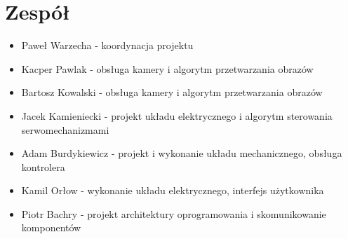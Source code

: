 \documentclass[a4paper, 11pt]{article}
\begin{document}
\newpage
\section{Zespół}
\begin{itemize}
\item Paweł Warzecha - koordynacja projektu 
\item Kacper Pawlak - obsługa kamery i algorytm przetwarzania obrazów 
\item Bartosz Kowalski - obsługa kamery i algorytm przetwarzania obrazów
\item Jacek Kamieniecki - projekt układu elektrycznego i algorytm sterowania serwomechanizmami
\item Adam Burdykiewicz - projekt i wykonanie układu mechanicznego, obsługa kontrolera
\item Kamil Orłow - wykonanie układu elektrycznego, interfejs użytkownika
\item Piotr Bachry - projekt architektury oprogramowania i skomunikowanie komponentów
\end{itemize}

\end{document}
